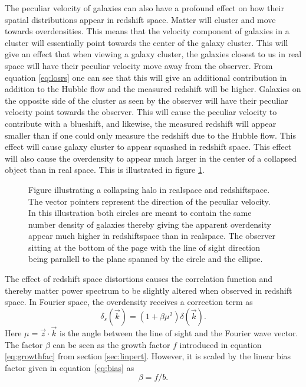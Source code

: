 The peculiar velocity of galaxies can also have a profound effect on how their
spatial distributions appear in redshift space. Matter will cluster and move
towards overdensities. This means that the velocity component of galaxies in a
cluster will essentially point towards the center of the galaxy cluster. This
will give an effect that when viewing a galaxy cluster, the galaxies closest to
us in real space will have their peculiar velocity move away from the observer.
From equation \ref{eq:losrs} one can see that this will give an additional
contribution in addition to the Hubble flow and the measured redshift will be
higher. Galaxies on the opposite side of the cluster as seen by the observer
will have their peculiar velocity point towards the observer. This will cause
the peculiar velocity to contribute with a blueshift, and likewise, the measured
redshift will appear smaller than if one could only measure the redshift due to
the Hubble flow. This effect will cause galaxy cluster to appear squashed in
redshift space. This effect will also cause the overdensity to appear much larger
in the center of a collapsed object than in real space. This is illustrated in
figure \ref{fig:rsddistortion}.\\

\begin{figure}[htbp]
    \caption{Figure illustrating a collapsing halo in realspace and redshiftspace. The vector pointers represent the direction of the peculiar velocity. In this illustration both circles are meant to contain the same number density of galaxies thereby giving the apparent overdensity appear much higher in redshiftspace than in realspace. The observer sitting at the bottom of the page with the line of sight direction being parallell to the plane spanned by the circle and the ellipse.}
    \label{fig:rsddistortion}
\end{figure}
The effect of redshift space distortions causes the correlation function and thereby
matter power spectrum to be slightly altered when observed in redshift space. In
Fourier space, the overdensity receives a correction term as\cite[p.~279]{Dodelson:1282338}
\begin{equation}
    \delta_s(\vec{k})=(1+\beta\mu^2)\delta(\vec{k}).
\end{equation}
Here $\mu=\vec{z}\cdot\vec{k}$ is the angle
between the line of sight and the Fourier wave vector. The factor $\beta$ can be
seen as the growth factor $f$ introduced in equation \ref{eq:growthfac} from
section \ref{sec:linpert}. However, it is scaled by the linear bias factor given in equation \ref{eq:bias} as
\begin{equation}\label{eq:beta}
    \beta=f/b.
\end{equation} 
